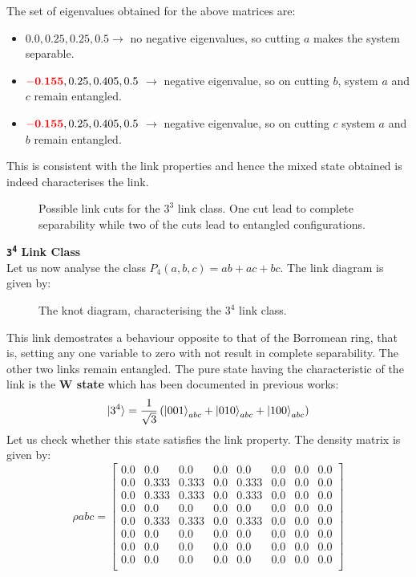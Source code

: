 \documentclass{scrartcl}
\begin{document}
            The set of eigenvalues obtained for the above matrices are:
            \begin{itemize}
                \item $0.0, 0.25, 0.25, 0.5 \longrightarrow$ no negative eigenvalues, so cutting $a$ makes the system separable.        
                \item $\mathbf{\mathcolor{red}{-0.155}}, 0.25, 0.405, 0.5$ $\longrightarrow$ negative eigenvalue, so on cutting $b$, system $a$ and $c$ remain entangled.
                \item $\mathbf{\mathcolor{red}{-0.155}}, 0.25, 0.405, 0.5$ $\longrightarrow$ negative eigenvalue, so on cutting $c$  system $a$ and $b$ remain entangled.
            \end{itemize}
            This is consistent with the link properties and hence the mixed state obtained is indeed characterises the link. 
            \begin{figure}
                \centering
                \scalebox{0.8}{ }
                \caption{Possible link cuts for the $3^3$ link class. One cut lead to complete separability while two of the cuts lead to entangled configurations.}
            \end{figure}
\textbf{\large \texttt{3\textsuperscript{4}} Link Class} \\[0.3cm]
Let us now analyse the class $P_4(a,b,c) = ab+ac+bc$. The link diagram is given by:
\begin{figure}[H]
    \centering
    
  \caption{The knot diagram, characterising the $3^4$ link class.}
\end{figure}
\noindent
This link demostrates a behaviour opposite to that of the Borromean ring, that is, setting any one variable to zero with not result in complete separability. The other two links remain entangled. The pure state having the characteristic of the link is the \textbf{W state} which has been documented in previous works:
$$\ket{3^4} = \frac{1}{\sqrt{3}}\left( \ket{001}_{abc}+\ket{010}_{abc}+\ket{100}_{abc} \right)$$ 
Let us check whether this state satisfies the link property. The density matrix is given by:
\begin{equation*}
    \rho{abc}=
    \left[
    \begin{array}{cccccccc}
    0.0 & 0.0 & 0.0 & 0.0 & 0.0 & 0.0 & 0.0 & 0.0 \\
    0.0 & 0.333 & 0.333 & 0.0 & 0.333 & 0.0 & 0.0 & 0.0 \\
    0.0 & 0.333 & 0.333 & 0.0 & 0.333 & 0.0 & 0.0 & 0.0 \\
    0.0 & 0.0 & 0.0 & 0.0 & 0.0 & 0.0 & 0.0 & 0.0 \\
    0.0 & 0.333 & 0.333 & 0.0 & 0.333 & 0.0 & 0.0 & 0.0 \\
    0.0 & 0.0 & 0.0 & 0.0 & 0.0 & 0.0 & 0.0 & 0.0 \\
    0.0 & 0.0 & 0.0 & 0.0 & 0.0 & 0.0 & 0.0 & 0.0 \\
    0.0 & 0.0 & 0.0 & 0.0 & 0.0 & 0.0 & 0.0 & 0.0 \\
    \end{array}
    \right]
    \end{equation*}
\end{document}
